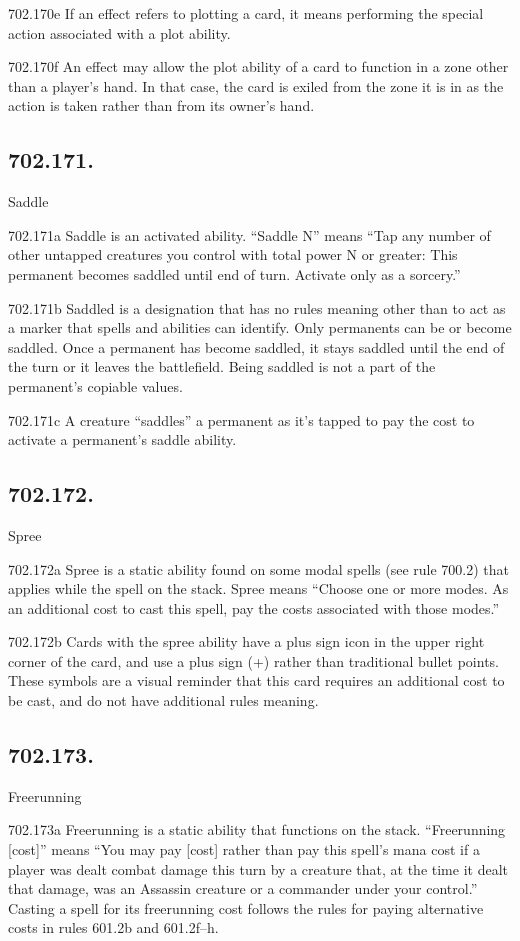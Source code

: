 702.170e If an effect refers to plotting a card, it means performing the special action associated with a plot ability.

702.170f An effect may allow the plot ability of a card to function in a zone other than a player’s hand. In that case, the card is exiled from the zone it is in as the action is taken rather than from its owner’s hand.

\subsection*{702.171.}
Saddle

702.171a Saddle is an activated ability. “Saddle N” means “Tap any number of other untapped creatures you control with total power N or greater: This permanent becomes saddled until end of turn. Activate only as a sorcery.”

702.171b Saddled is a designation that has no rules meaning other than to act as a marker that spells and abilities can identify. Only permanents can be or become saddled. Once a permanent has become saddled, it stays saddled until the end of the turn or it leaves the battlefield. Being saddled is not a part of the permanent’s copiable values.

702.171c A creature “saddles” a permanent as it’s tapped to pay the cost to activate a permanent’s saddle ability.

\subsection*{702.172.}
Spree

702.172a Spree is a static ability found on some modal spells (see rule 700.2) that applies while the spell on the stack. Spree means “Choose one or more modes. As an additional cost to cast this spell, pay the costs associated with those modes.”

702.172b Cards with the spree ability have a plus sign icon in the upper right corner of the card, and use a plus sign (+) rather than traditional bullet points. These symbols are a visual reminder that this card requires an additional cost to be cast, and do not have additional rules meaning.

\subsection*{702.173.}
Freerunning

702.173a Freerunning is a static ability that functions on the stack. “Freerunning [cost]” means “You may pay [cost] rather than pay this spell’s mana cost if a player was dealt combat damage this turn by a creature that, at the time it dealt that damage, was an Assassin creature or a commander under your control.” Casting a spell for its freerunning cost follows the rules for paying alternative costs in rules 601.2b and 601.2f–h.

